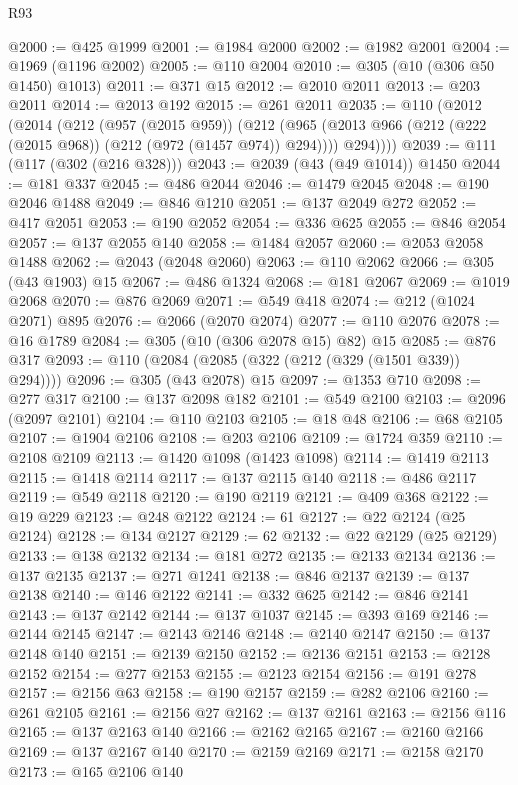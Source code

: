 \begin{lexlean}{R93}
\begin{coremodule}
@2000 := @425 @1999
@2001 := @1984 @2000
@2002 := @1982 @2001
@2004 := @1969 (@1196 @2002)
@2005 := @110 @2004
@2010 := @305 (@10 (@306 @50 @1450) @1013)
@2011 := @371 @15
@2012 := @2010 @2011
@2013 := @203 @2011
@2014 := @2013 @192
@2015 := @261 @2011
@2035 := @110
    (@2012
      (@2014
        (@212
          (@957 (@2015 @959))
          (@212
            (@965 (@2013 @966 (@212 (@222 (@2015 @968)) (@212 (@972 (@1457 @974)) @294))))
            @294))))
@2039 := @111 (@117 (@302 (@216 @328)))
@2043 := @2039 (@43 (@49 @1014)) @1450
@2044 := @181 @337
@2045 := @486 @2044
@2046 := @1479 @2045
@2048 := @190 @2046 @1488
@2049 := @846 @1210
@2051 := @137 @2049 @272
@2052 := @417 @2051
@2053 := @190 @2052
@2054 := @336 @625
@2055 := @846 @2054
@2057 := @137 @2055 @140
@2058 := @1484 @2057
@2060 := @2053 @2058 @1488
@2062 := @2043 (@2048 @2060)
@2063 := @110 @2062
@2066 := @305 (@43 @1903) @15
@2067 := @486 @1324
@2068 := @181 @2067
@2069 := @1019 @2068
@2070 := @876 @2069
@2071 := @549 @418
@2074 := @212 (@1024 @2071) @895
@2076 := @2066 (@2070 @2074)
@2077 := @110 @2076
@2078 := @16 @1789
@2084 := @305 (@10 (@306 @2078 @15) @82) @15
@2085 := @876 @317
@2093 := @110 (@2084 (@2085 (@322 (@212 (@329 (@1501 @339)) @294))))
@2096 := @305 (@43 @2078) @15
@2097 := @1353 @710
@2098 := @277 @317
@2100 := @137 @2098 @182
@2101 := @549 @2100
@2103 := @2096 (@2097 @2101)
@2104 := @110 @2103
@2105 := @18 @48
@2106 := @68 @2105
@2107 := @1904 @2106
@2108 := @203 @2106
@2109 := @1724 @359
@2110 := @2108 @2109
@2113 := @1420 @1098 (@1423 @1098)
@2114 := @1419 @2113
@2115 := @1418 @2114
@2117 := @137 @2115 @140
@2118 := @486 @2117
@2119 := @549 @2118
@2120 := @190 @2119
@2121 := @409 @368
@2122 := @19 @229
@2123 := @248 @2122
@2124 := 61
@2127 := @22 @2124 (@25 @2124)
@2128 := @134 @2127
@2129 := 62
@2132 := @22 @2129 (@25 @2129)
@2133 := @138 @2132
@2134 := @181 @272
@2135 := @2133 @2134
@2136 := @137 @2135
@2137 := @271 @1241
@2138 := @846 @2137
@2139 := @137 @2138
@2140 := @146 @2122
@2141 := @332 @625
@2142 := @846 @2141
@2143 := @137 @2142
@2144 := @137 @1037
@2145 := @393 @169
@2146 := @2144 @2145
@2147 := @2143 @2146
@2148 := @2140 @2147
@2150 := @137 @2148 @140
@2151 := @2139 @2150
@2152 := @2136 @2151
@2153 := @2128 @2152
@2154 := @277 @2153
@2155 := @2123 @2154
@2156 := @191 @278
@2157 := @2156 @63
@2158 := @190 @2157
@2159 := @282 @2106
@2160 := @261 @2105
@2161 := @2156 @27
@2162 := @137 @2161
@2163 := @2156 @116
@2165 := @137 @2163 @140
@2166 := @2162 @2165
@2167 := @2160 @2166
@2169 := @137 @2167 @140
@2170 := @2159 @2169
@2171 := @2158 @2170
@2173 := @165 @2106 @140

\end{coremodule}
\end{lexlean}
